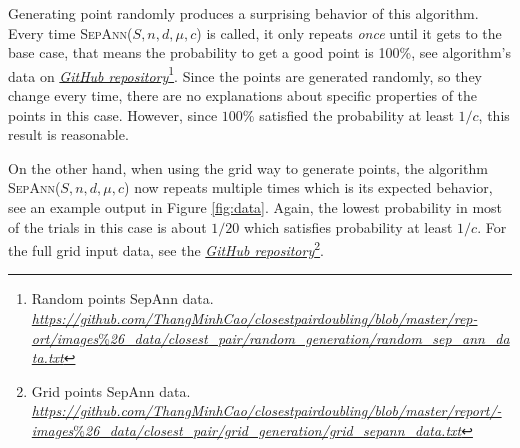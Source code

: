 \documentclass[12pt,english,]{article}
\begin{document}
Generating point randomly produces a surprising behavior of this
algorithm. Every time \textsc{SepAnn($S,n,d,\mu,c$)} is called, it only
repeats \emph{once} until it gets to the base case, that means the
probability to get a good point is 100\%, see algorithm's data on
\href{https://github.com/ThangMinhCao/closestpairdoubling/blob/master/report/Images/closest_pair/random_generation/random_sep_ann_data.txt}{\emph{GitHub
repository}}\footnote{Random points SepAnn data.
  \href{https://github.com/ThangMinhCao/closestpairdoubling/blob/master/report/images_\%26_data/closest_pair/random_generation/random_sep_ann_data.txt}{\emph{https://github.com/ThangMinhCao/closestpairdoubling/blob/master/rep-
  ort/images}\%\emph{26\_data/closest\_pair/random\_generation/random\_sep\_ann\_data.txt}}}.
Since the points are generated randomly, so they change every time,
there are no explanations about specific properties of the points in
this case. However, since \(100\%\) satisfied the probability at least
\(1/c\), this result is reasonable.

On the other hand, when using the grid way to generate points, the
algorithm \textsc{SepAnn($S,n,d,\mu,c$)} now repeats multiple times
which is its expected behavior, see an example output in Figure
\ref{fig:data}. Again, the lowest probability in most of the trials in
this case is about \(1/20\) which satisfies probability at least
\(1/c\). For the full grid input data, see the
\href{https://github.com/ThangMinhCao/closestpairdoubling/blob/master/report/images_\%26_data/closest_pair/grid_generation/grid_sepann_data.txt}{\emph{GitHub
repository}}\footnote{Grid points SepAnn data.
  \href{https://github.com/ThangMinhCao/closestpairdoubling/blob/master/report/images_\%26_data/closest_pair/grid_generation/grid_sepann_data.txt}{\emph{https://github.com/ThangMinhCao/closestpairdoubling/blob/master/report/-}
  \emph{images}\%\emph{26\_data/closest\_pair/grid\_generation/grid\_sepann\_data.txt}}}.
\end{document}
